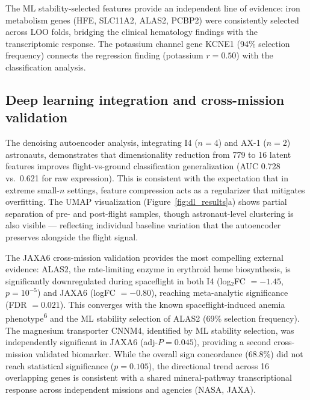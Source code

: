 \documentclass[11pt,a4paper]{article}
\begin{document}
The ML stability-selected features provide an independent line of evidence: iron metabolism genes (HFE, SLC11A2, ALAS2, PCBP2) were consistently selected across LOO folds, bridging the clinical hematology findings with the transcriptomic response. The potassium channel gene KCNE1 (94\% selection frequency) connects the regression finding (potassium $r = 0.50$) with the classification analysis.

\subsection{Deep learning integration and cross-mission validation}

The denoising autoencoder analysis, integrating I4 ($n = 4$) and AX-1 ($n = 2$) astronauts, demonstrates that dimensionality reduction from 779 to 16 latent features improves flight-vs-ground classification generalization (AUC 0.728 vs.\ 0.621 for raw expression). This is consistent with the expectation that in extreme small-$n$ settings, feature compression acts as a regularizer that mitigates overfitting. The UMAP visualization (Figure~\ref{fig:dl_results}a) shows partial separation of pre- and post-flight samples, though astronaut-level clustering is also visible --- reflecting individual baseline variation that the autoencoder preserves alongside the flight signal.

The JAXA6 cross-mission validation provides the most compelling external evidence: ALAS2, the rate-limiting enzyme in erythroid heme biosynthesis, is significantly downregulated during spaceflight in both I4 (log$_2$FC $= -1.45$, $p = 10^{-5}$) and JAXA6 (logFC $= -0.80$), reaching meta-analytic significance (FDR $= 0.021$). This converges with the known spaceflight-induced anemia phenotype\textsuperscript{6} and the ML stability selection of ALAS2 (69\% selection frequency). The magnesium transporter CNNM4, identified by ML stability selection, was independently significant in JAXA6 (adj-$P = 0.045$), providing a second cross-mission validated biomarker. While the overall sign concordance (68.8\%) did not reach statistical significance ($p = 0.105$), the directional trend across 16 overlapping genes is consistent with a shared mineral-pathway transcriptional response across independent missions and agencies (NASA, JAXA).
\end{document}
